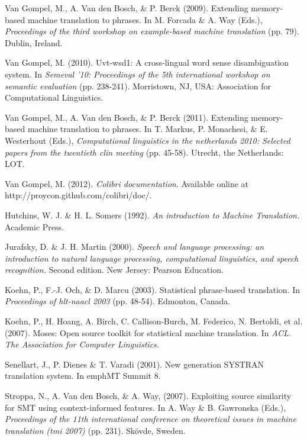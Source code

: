 \documentclass[12pt]{article}
\begin{document}
\begin{thebibliography}{99}
Van Gompel, M., A. Van den Bosch, \& P. Berck (2009). Extending memory-based machine translation to phrases. In M. Forcada \& A. Way (Eds.), \emph{Proceedings of the third workshop on example-based machine translation} (pp. 79). Dublin, Ireland.

Van Gompel, M. (2010). Uvt-wsd1: A cross-lingual word sense disambiguation system. In \emph{Semeval '10: Proceedings of the 5th international workshop on semantic evaluation} (pp. 238-241). Morristown, NJ, USA: Association for Computational Linguistics.

Van Gompel, M., A. Van den Bosch, \& P. Berck (2011). Extending memory-based
machine translation to phrases. In T. Markus, P. Monachesi, \& E. Westerhout (Eds.), \emph{Computational linguistics in the netherlands 2010: Selected papers from the twentieth clin meeting} (pp. 45-58). Utrecht, the Netherlands: LOT.

Van Gompel, M. (2012). \emph{Colibri documentation}. Available online at http://proycon.github.com/colibri/doc/.

Hutchins, W. J. \& H. L. Somers (1992). \emph{An introduction to Machine Translation.} Academic Press.

Jurafsky, D. \& J. H. Martin (2000). \emph{Speech and language processing: an introduction to natural language processing, computational linguistics, and speech recognition.} Second edition. New Jersey: Pearson Education.

Koehn, P., F.-J. Och, \& D. Marcu (2003). Statistical phrase-based translation. In \emph{Proceedings of hlt-naacl 2003} (pp. 48-54). Edmonton, Canada.

Koehn, P., H. Hoang, A. Birch, C. Callison-Burch, M. Federico, N. Bertoldi, et al. (2007). Moses: Open source toolkit for statistical machine translation. In \emph{ACL. The Association for Computer Linguistics.}

Senellart, J., P. Dienes \& T. Varadi (2001). New generation SYSTRAN translation system. In emph{MT Summit 8}.

Stroppa, N., A. Van den Bosch, \& A. Way, (2007). Exploiting source similarity for SMT using context-informed features. In A. Way \& B. Gawronska (Eds.), \emph{Proceedings of the 11th international conference on theoretical issues in machine translation (tmi 2007)} (pp. 231). Skövde, Sweden.

\end{thebibliography}
\end{document}
